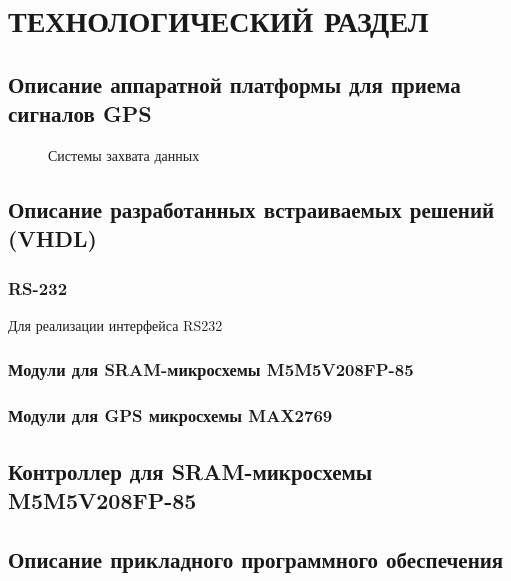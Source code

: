 \section{ТЕХНОЛОГИЧЕСКИЙ РАЗДЕЛ}

\subsection{Описание аппаратной платформы для приема сигналов GPS}

\begin{figure}[H]
\caption{Системы захвата данных}
\label{pic:board_scheme}
\end{figure}

\subsection{Описание разработанных встраиваемых решений (VHDL)}

\subsubsection{RS-232}
\label{razdel3_rs232}
Для реализации интерфейса RS232 

\subsubsection{Модули для SRAM-микросхемы M5M5V208FP-85}
\label{razdel3_sram}

\subsubsection{Модули для GPS микросхемы MAX2769}
\label{razdel3_gps}

\subsection{Контроллер для SRAM-микросхемы M5M5V208FP-85}
\label{sec:sram_controller}

\subsection{Описание прикладного программного обеспечения}

\newpage
